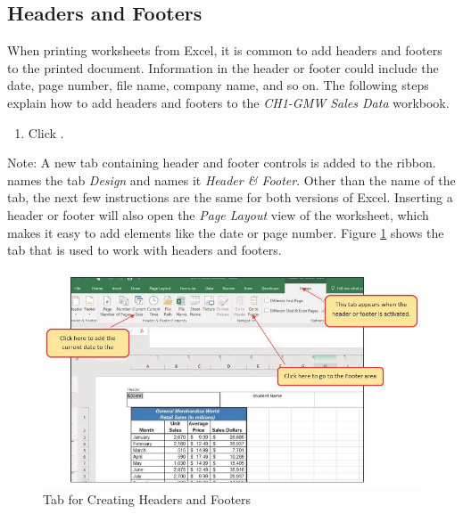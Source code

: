 \subsection{Headers and Footers}

When printing worksheets from Excel, it is common to add headers and footers to the printed document. Information in the header or footer could include the date, page number, file name, company name, and so on. The following steps explain how to add headers and footers to the \textit{CH1-GMW Sales Data} workbook.

\begin{enumerate}
	\item Click . 
\end{enumerate}

Note: A new tab containing header and footer controls is added to the ribbon.  names the tab \textit{Design} and  names it \textit{Header \& Footer}. Other than the name of the tab, the next few instructions are the same for both versions of Excel. Inserting a header or footer will also open the \textit{Page Layout} view of the worksheet, which makes it easy to add elements like the date or page number. Figure \ref{01:fig50} shows the tab that is used to work with headers and footers.

\begin{figure}[H]
	\centering
	\includegraphics[width=\maxwidth{.95\linewidth}]{gfx/ch01_fig50}
	\caption{Tab for Creating Headers and Footers}
	\label{01:fig50}
\end{figure}

